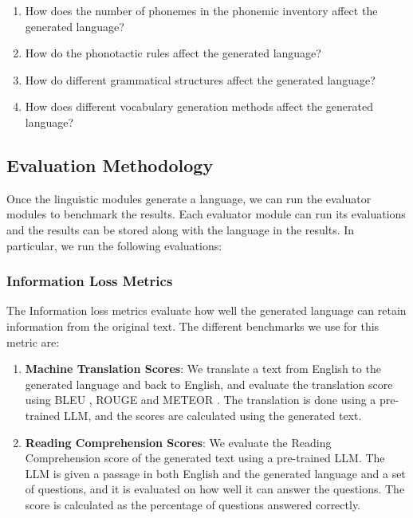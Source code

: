 \begin{enumerate}
	\item How does the number of phonemes in the phonemic inventory affect the generated language?
	\item How do the phonotactic rules affect the generated language?
	\item How do different grammatical structures affect the generated language?
	\item How does different vocabulary generation methods affect the generated language?
\end{enumerate}



\subsection{Evaluation Methodology}
Once the linguistic modules generate a language, we can run the evaluator modules to benchmark the results. Each evaluator module can run its evaluations
and the results can be stored along with the language in the results. In particular, we run the following evaluations:

\subsubsection{Information Loss Metrics}
The Information loss metrics evaluate how well the generated language can retain information from the original text. The different benchmarks we use for this metric are:

\begin{enumerate}
	\item \textbf{Machine Translation Scores}: We translate a text from English to the generated language and back to English, and evaluate the translation score using BLEU \cite{papineniBLEUMethodAutomatic2002}, ROUGE \cite{linROUGEPackageAutomatic2004} and METEOR \cite{banerjeeMETEORAutomaticMetric2005}. 
	The translation is done using a pre-trained LLM, and the scores are calculated using the generated text.
	\item \textbf{Reading Comprehension Scores}: We evaluate the Reading Comprehension score of the generated text using a pre-trained LLM. 
	The LLM is given a passage in both English and the generated language and a set of questions, and it is evaluated on how well it can answer the questions. 
	The score is calculated as the percentage of questions answered correctly.
\end{enumerate}

